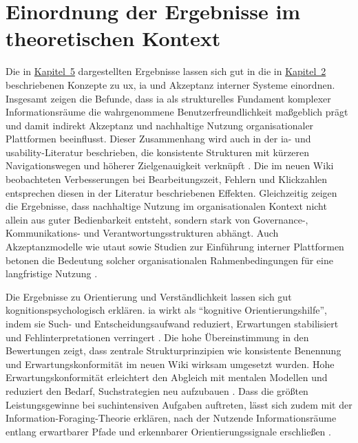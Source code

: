 \section{Einordnung der Ergebnisse im theoretischen Kontext}
\label{sec:06-01_theoretical-positioning}

Die in \hyperref[ch:05_analysis-and-results]{Kapitel~5} dargestellten Ergebnisse lassen sich gut in die in \hyperref[ch:02_theoretical-foundations]{Kapitel~2} beschriebenen Konzepte zu \acrlong{ux}, \Gls{ia} und Akzeptanz interner Systeme einordnen. Insgesamt zeigen die Befunde, dass \Gls{ia} als strukturelles Fundament komplexer Informationsräume die wahrgenommene Benutzerfreundlichkeit maßgeblich prägt und damit indirekt Akzeptanz und nachhaltige Nutzung organisationaler Plattformen beeinflusst.
Dieser Zusammenhang wird auch in der \Gls{ia}- und \Gls{usability}-Literatur beschrieben, die konsistente Strukturen mit kürzeren Navigationswegen und höherer Zielgenauigkeit verknüpft \cite{303:Rosenfeld2015,201:ArangoIA,108:ArangoFirstPrinciples2024,501:ISO9241-11,113:NNGIntranetGuidelines}. Die im neuen Wiki beobachteten Verbesserungen bei Bearbeitungszeit, Fehlern und Klickzahlen entsprechen diesen in der Literatur beschriebenen Effekten.
Gleichzeitig zeigen die Ergebnisse, dass nachhaltige Nutzung im organisationalen Kontext nicht allein aus guter Bedienbarkeit entsteht, sondern stark von Governance-, Kommunikations- und Verantwortungsstrukturen abhängt. Auch Akzeptanzmodelle wie \acrshort{utaut} sowie Studien zur Einführung interner Plattformen betonen die Bedeutung solcher organisationalen Rahmenbedingungen für eine langfristige Nutzung \cite{103:Venkatesh2003,114:IntranetAdoption}.

Die Ergebnisse zu Orientierung und Verständlichkeit lassen sich gut kognitionspsychologisch erklären. \Gls{ia} wirkt als \enquote{kognitive Orientierungshilfe}, indem sie Such- und Entscheidungsaufwand reduziert, Erwartungen stabilisiert und Fehlinterpretationen verringert \cite{303:Rosenfeld2015,105:Sweller1988}. Die hohe Übereinstimmung in den Bewertungen zeigt, dass zentrale Strukturprinzipien wie konsistente Benennung und Erwartungskonformität im neuen Wiki wirksam umgesetzt wurden.
Hohe Erwartungskonformität erleichtert den Abgleich mit mentalen Modellen und reduziert den Bedarf, Suchstrategien neu aufzubauen \cite{905:Norman1983,107:NNGRealWorld2024}. Dass die größten Leistungsgewinne bei suchintensiven Aufgaben auftreten, lässt sich zudem mit der Information-Foraging-Theorie erklären, nach der Nutzende Informationsräume entlang erwartbarer Pfade und erkennbarer Orientierungssignale erschließen \cite{416:PirolliCard1999}.

